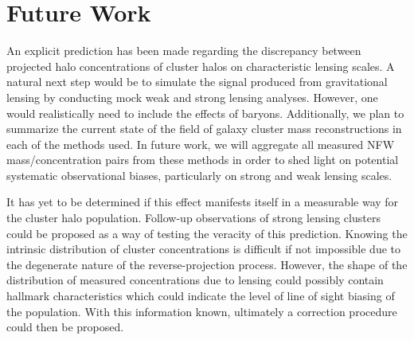 \section{Future Work}

An explicit prediction has been made regarding the discrepancy between
projected halo concentrations of cluster halos on characteristic
lensing scales. A natural next step would be to simulate the signal
produced from gravitational lensing by conducting mock weak and strong
lensing analyses. However, one would realistically need to include the
effects of baryons. Additionally, we plan to summarize the current
state of the field of galaxy cluster mass reconstructions in each of
the methods used. In future work, we will aggregate all measured NFW
mass/concentration pairs from these methods in order to shed light on
potential systematic observational biases, particularly on strong and
weak lensing scales.  

It has yet to be determined if this effect manifests itself in a
measurable way for the cluster halo population. Follow-up observations
of strong lensing clusters could be proposed as a way of testing the
veracity of this prediction. Knowing the intrinsic distribution of
cluster concentrations is difficult if not impossible due to the
degenerate nature of the reverse-projection process. However, the shape
of the distribution of measured concentrations due to lensing could
possibly contain hallmark characteristics which could indicate the
level of line of sight biasing of the population. With this
information known, ultimately a correction procedure could then be
proposed.